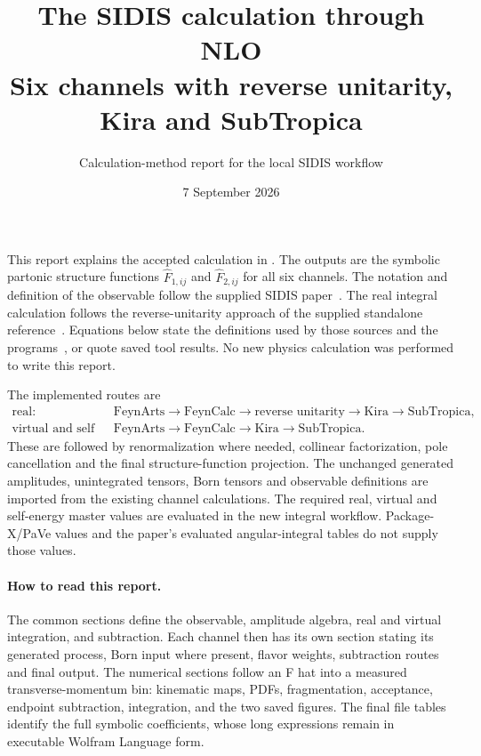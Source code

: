 \documentclass[11pt,a4paper]{article}
\title{The SIDIS calculation through NLO\\
\large Six channels with reverse unitarity, Kira and SubTropica}
\author{Calculation-method report for the local SIDIS workflow}
\date{7 September 2026}
\newcommand{\Fhat}{\widehat F}
\begin{document}
\maketitle

This report explains the accepted calculation in .
The outputs are the symbolic partonic structure functions
$\Fhat_{1,ij}$ and $\Fhat_{2,ij}$ for all six channels.
The notation and definition of the observable follow the supplied SIDIS
paper~\cite{sidispaper}. The real integral calculation follows the
reverse-unitarity approach of the supplied standalone reference~\cite{standalone}.
Equations below state the definitions used by those sources and the programs~\cite{localcalculation},
or quote saved tool results. No new physics calculation was performed to
write this report.

The implemented routes are
\begin{align*}
\text{real:}\quad&
\text{FeynArts}\to\text{FeynCalc}\to\text{reverse unitarity}
\to\text{Kira}\to\text{SubTropica},\\
\text{virtual and self energies:}\quad&
\text{FeynArts}\to\text{FeynCalc}\to\text{Kira}\to\text{SubTropica}.
\end{align*}
These are followed by renormalization where needed, collinear factorization,
pole cancellation and the final structure-function projection.
The unchanged generated amplitudes, unintegrated tensors, Born tensors and
observable definitions are imported from the existing channel calculations.
The required real, virtual and self-energy master values are evaluated in
the new integral workflow. Package-X/PaVe values and the paper's evaluated
angular-integral tables do not supply those values.

\paragraph{How to read this report.}
The common sections define the observable, amplitude algebra, real and
virtual integration, and subtraction. Each channel then has its own
section stating its generated process, Born input where present, flavor
weights, subtraction routes and final output. The numerical sections
follow an F hat into a measured transverse-momentum bin: kinematic maps,
PDFs, fragmentation, acceptance, endpoint subtraction, integration, and
the two saved figures. The final file tables identify the full symbolic
coefficients, whose long expressions remain in executable Wolfram Language
form.
\end{document}
